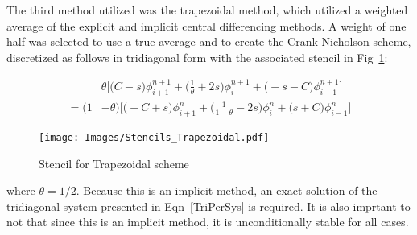 \documentclass[twocolumn,10pt]{asme2ej}
\begin{document}
The third method utilized was the trapezoidal method, which utilized a weighted average of the explicit and implicit central differencing methods.  A weight of one half was selected to use a true average and to create the Crank-Nicholson scheme, discretized as follows in tridiagonal form with the associated stencil in Fig~\ref{Trapz}:

\begin{equation}
\begin{split}
&\theta\Big[\big(C-s\big)\phi^{n+1}_{i+1} + \big(\frac{1}{\theta}+2s\big)\phi^{n+1}_{i} + \big(-s-C\big)\phi^{n+1}_{i-1}\Big]\\
 = (1&-\theta)\Big[\big(-C+s\big)\phi^{n}_{i+1} + \big(\frac{1}{1-\theta}-2s\big)\phi^{n}_{i} + \big(s+C\big)\phi^{n}_{i-1}\Big]
\end{split}
\end{equation}

\begin{figure}[thb]
\begin{center}
\texttt{[image: Images/Stencils\_Trapezoidal.pdf]}
\caption{Stencil for Trapezoidal scheme}
\label{Trapz}
\end{center}
\end{figure}

\noindent where $\theta = 1/2$. Because this is an implicit method, an exact solution of the tridiagonal system presented in Eqn~\ref{TriPerSys} is required.  It is also imprtant to not that since this is an implicit method, it is unconditionally stable for all cases.
\end{document}
